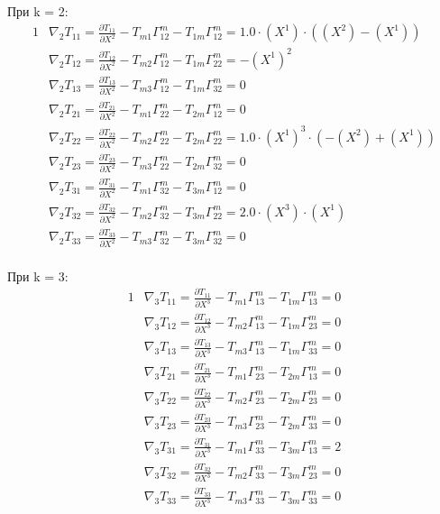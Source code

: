 \documentclass[a4paper, 12pt, oneside]{article}
\begin{document}
При k = 2:\\
\begin{alignat*}{1}
  & \nabla_2T_{11} = \frac{\partial T_{11}}{\partial X^2} - T_{m1}\Gamma^m_{12} - T_{1m}\Gamma^m_{12} = 1.0\cdot (X^1)\cdot ((X^2) - (X^1)) \\
  & \nabla_2T_{12} = \frac{\partial T_{12}}{\partial X^2} - T_{m2}\Gamma^m_{12} - T_{1m}\Gamma^m_{22} = -(X^1)^2 \\
  & \nabla_2T_{13} = \frac{\partial T_{13}}{\partial X^2} - T_{m3}\Gamma^m_{12} - T_{1m}\Gamma^m_{32} = 0 \\
  & \nabla_2T_{21} = \frac{\partial T_{21}}{\partial X^2} - T_{m1}\Gamma^m_{22} - T_{2m}\Gamma^m_{12} = 0 \\
  & \nabla_2T_{22} = \frac{\partial T_{22}}{\partial X^2} - T_{m2}\Gamma^m_{22} - T_{2m}\Gamma^m_{22} = 1.0\cdot (X^1)^3\cdot (-(X^2) + (X^1)) \\
  & \nabla_2T_{23} = \frac{\partial T_{23}}{\partial X^2} - T_{m3}\Gamma^m_{22} - T_{2m}\Gamma^m_{32} = 0 \\
  & \nabla_2T_{31} = \frac{\partial T_{31}}{\partial X^2} - T_{m1}\Gamma^m_{32} - T_{3m}\Gamma^m_{12} = 0 \\
  & \nabla_2T_{32} = \frac{\partial T_{32}}{\partial X^2} - T_{m2}\Gamma^m_{32} - T_{3m}\Gamma^m_{22} = 2.0\cdot (X^3)\cdot (X^1) \\
  & \nabla_2T_{33} = \frac{\partial T_{33}}{\partial X^2} - T_{m3}\Gamma^m_{32} - T_{3m}\Gamma^m_{32} = 0 
\end{alignat*}\\
При k = 3:\\
\begin{alignat*}{1}
  & \nabla_3T_{11} = \frac{\partial T_{11}}{\partial X^3} - T_{m1}\Gamma^m_{13} - T_{1m}\Gamma^m_{13} = 0 \\
  & \nabla_3T_{12} = \frac{\partial T_{12}}{\partial X^3} - T_{m2}\Gamma^m_{13} - T_{1m}\Gamma^m_{23} = 0 \\
  & \nabla_3T_{13} = \frac{\partial T_{13}}{\partial X^3} - T_{m3}\Gamma^m_{13} - T_{1m}\Gamma^m_{33} = 0 \\
  & \nabla_3T_{21} = \frac{\partial T_{21}}{\partial X^3} - T_{m1}\Gamma^m_{23} - T_{2m}\Gamma^m_{13} = 0 \\
  & \nabla_3T_{22} = \frac{\partial T_{22}}{\partial X^3} - T_{m2}\Gamma^m_{23} - T_{2m}\Gamma^m_{23} = 0 \\
  & \nabla_3T_{23} = \frac{\partial T_{23}}{\partial X^3} - T_{m3}\Gamma^m_{23} - T_{2m}\Gamma^m_{33} = 0 \\
  & \nabla_3T_{31} = \frac{\partial T_{31}}{\partial X^3} - T_{m1}\Gamma^m_{33} - T_{3m}\Gamma^m_{13} = 2 \\
  & \nabla_3T_{32} = \frac{\partial T_{32}}{\partial X^3} - T_{m2}\Gamma^m_{33} - T_{3m}\Gamma^m_{23} = 0 \\
  & \nabla_3T_{33} = \frac{\partial T_{33}}{\partial X^3} - T_{m3}\Gamma^m_{33} - T_{3m}\Gamma^m_{33} = 0 
\end{alignat*}\\
\end{document}
